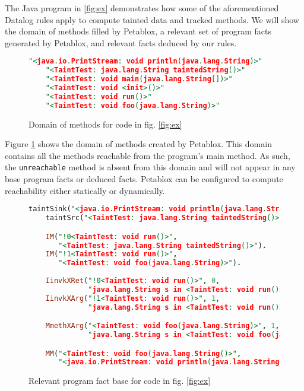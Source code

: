 The Java program in \ref{fig:ex} demonstrates how some of the
aforementioned Datalog rules apply to compute tainted data and tracked
methods. We will show the domain of methods filled by Petablox, a
relevant set of program facts generated by Petablox, and relevant
facts deduced by our rules.

\begin{figure}[H]
  \begin{lstlisting}[language=Prolog]
    "<java.io.PrintStream: void println(java.lang.String)>"
    "<TaintTest: java.lang.String taintedString()>"
    "<TaintTest: void main(java.lang.String[])>"
    "<TaintTest: void <init>()>"
    "<TaintTest: void run()>"
    "<TaintTest: void foo(java.lang.String)>"
  \end{lstlisting}
  \caption{Domain of methods for code in fig. \ref{fig:ex}}\label{fig:domM}
\end{figure}

Figure \ref{fig:domM} shows the domain of methods created by
Petablox. This domain contains all the methods reachable from the
program's main method. As such, the \texttt{unreachable} method is
absent from this domain and will not appear in any base program facts
or deduced facts. Petablox can be configured to compute reachability
either statically or dynamically.

\begin{figure}[H]
  \begin{lstlisting}[language=Prolog]
    taintSink("<java.io.PrintStream: void println(java.lang.String)>").
    taintSrc("<TaintTest: java.lang.String taintedString()>").

    IM("!0<TaintTest: void run()>",
       "<TaintTest: java.lang.String taintedString()>").
    IM("!1<TaintTest: void run()>",
       "<TaintTest: void foo(java.lang.String)>").
    
    IinvkXRet("!0<TaintTest: void run()>", 0,
              "java.lang.String s in <TaintTest: void run()>").
    IinvkXArg("!1<TaintTest: void run()>", 1,
              "java.lang.String s in <TaintTest: void run()>").

    MmethXArg("<TaintTest: void foo(java.lang.String)>", 1,
              "java.lang.String s in <TaintTest: void foo(java.lang.String)>").

    MM("<TaintTest: void foo(java.lang.String()>",
       "<java.io.PrintStream: void println(java.lang.String)>").
  \end{lstlisting}
  \caption{Relevant program fact base for code in fig. \ref{fig:ex}}\label{fig:facts}
\end{figure}

